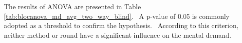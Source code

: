 %
%

The results of ANOVA are presented in Table \ref{tab:blocanova_md_avg_two_way_blind}.\ %
A p-value of 0.05 is commonly adopted as a threshold to confirm the hypothesis.\ %
According to this criterion, neither method or round have a significant influence on the mental demand.





